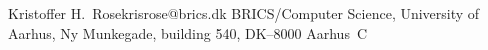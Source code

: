 \ifx\xyloaded\undefined  \fi
{}%
 {Kristoffer H.~Rose}{krisrose@brics.dk}%
 {BRICS/Computer Science, University of Aarhus, Ny Munkegade, building 540,
 DK--8000 Aarhus~C}
\xycatcodes
\xydef@{}
\xydef@\NoComputerModernTips{\NoTips}
\xyendinput
